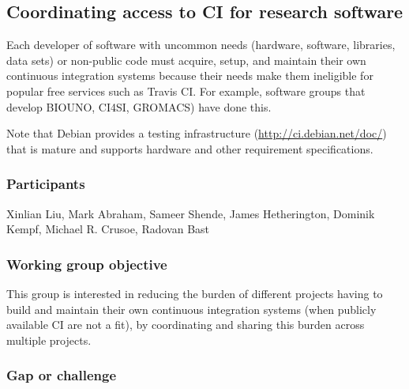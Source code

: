 \subsection{Coordinating access to CI for research software}
\label{sec:access}


Each developer of software with uncommon needs (hardware, software, libraries, data sets) or non-public code must acquire, setup, and maintain their own continuous integration systems because their needs make them ineligible for popular free services such as Travis CI.  For example, software groups that develop BIOUNO, CI4SI, GROMACS) have done this.  

Note that Debian provides a testing infrastructure (\href{https://ci.debian.net/doc/}{http://ci.debian.net/doc/}) that is mature and supports hardware and other requirement specifications. 



\subsubsection{Participants}

Xinlian Liu, Mark Abraham, Sameer Shende, James Hetherington, Dominik Kempf, Michael R. Crusoe, Radovan Bast

\subsubsection{Working group objective}

This group is interested in reducing the burden of different projects having to build and maintain their own continuous integration systems (when publicly available CI are not a fit), by coordinating and sharing this burden across multiple projects.

\subsubsection{Gap or challenge}

